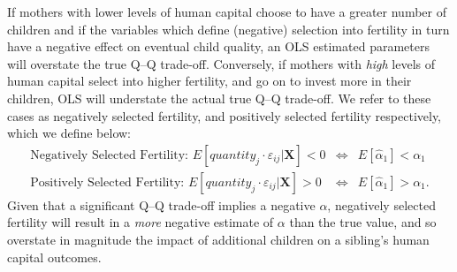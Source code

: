 \documentclass[subeqn]{article}
\begin{document}
\begin{spacing}{1.4}
If mothers with lower levels of human capital choose to have a greater number of
children and if the variables which define (negative) selection into fertility in turn
have a negative effect on eventual child quality, an OLS estimated parameters will
overstate the true Q--Q trade-off.  Conversely, if mothers with \emph{high} levels
of human capital select into higher fertility, and go on to invest more in their
children, OLS will understate the actual true Q--Q trade-off.  We refer to these
cases as negatively selected fertility, and positively selected fertility respectively,
which we define below:
\begin{eqnarray}
  \text{Negatively Selected Fertility:\ \ \ } E[quantity_{j}\cdot\varepsilon_{ij}|\bm{X}] < 0 &\Leftrightarrow& E[\hat\alpha_1] < \alpha_1 \nonumber \\
  \text{Positively Selected Fertility:\ \ \ }  E[quantity_{j}\cdot\varepsilon_{ij}|\bm{X}] > 0 &\Leftrightarrow& E[\hat\alpha_1] > \alpha_1. \nonumber
\end{eqnarray}
Given that a significant Q--Q trade-off implies a negative $\alpha$, negatively
selected fertility will result in a \emph{more} negative estimate of $\alpha$
than the true value, and so overstate in magnitude the impact of additional children
on a sibling's human capital outcomes.


\end{spacing}
\end{document}
